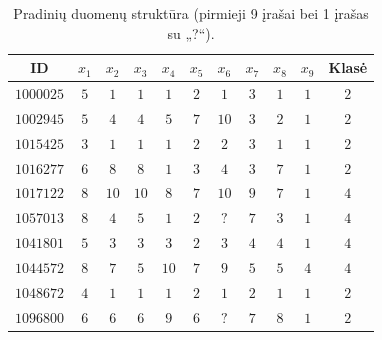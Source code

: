 \begin{table}[H]
    \centering
    \caption{Pradinių duomenų struktūra (pirmieji 9 įrašai bei 1 įrašas su „?“).}
    \begin{tabular}{|c|c|c|c|c|c|c|c|c|c|c|}
        \hline
        ID & $x_1$ & $x_2$ & $x_3$ & $x_4$ & $x_5$ & $x_6$ & $x_7$ & $x_8$ & $x_9$ & Klasė \\
        \hline
        $1000025$ & $5$ & $1$ & $1$ & $1$ & $2$ & $1$ & $3$ & $1$ & $1$ & $2$ \\ \hline
        $1002945$ & $5$ & $4$ & $4$ & $5$ & $7$ & $10$ & $3$ & $2$ & $1$ & $2$ \\ \hline
        $1015425$ & $3$ & $1$ & $1$ & $1$ & $2$ & $2$ & $3$ & $1$ & $1$ & $2$ \\ \hline
        $1016277$ & $6$ & $8$ & $8$ & $1$ & $3$ & $4$ & $3$ & $7$ & $1$ & $2$ \\ \hline
        $1017122$ & $8$ & $10$ & $10$ & $8$ & $7$ & $10$ & $9$ & $7$ & $1$ & $4$ \\ \hline
        $1057013$ & $8$ & $4$ & $5$ & $1$ & $2$ & $?$ & $7$ & $3$ & $1$ & $4$ \\ \hline
        $1041801$ & $5$ & $3$ & $3$ & $3$ & $2$ & $3$ & $4$ & $4$ & $1$ & $4$ \\ \hline
        $1044572$ & $8$ & $7$ & $5$ & $10$ & $7$ & $9$ & $5$ & $5$ & $4$ & $4$ \\ \hline
        $1048672$ & $4$ & $1$ & $1$ & $1$ & $2$ & $1$ & $2$ & $1$ & $1$ & $2$ \\ \hline
        $1096800$ & $6$ & $6$ & $6$ & $9$ & $6$ & $?$ & $7$ & $8$ & $1$ & $2$ \\ \hline
    \end{tabular}
    \label{tab:pradiniai_duomenys}
\end{table}